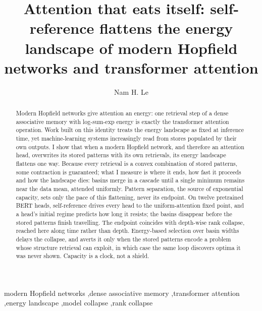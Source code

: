 \documentclass[preprint,12pt,authoryear]{elsarticle}
\begin{document}
\begin{frontmatter}

\title{Attention that eats itself: self-reference flattens the energy
landscape of modern Hopfield networks and transformer attention}

\author{Nam H. Le}

\begin{abstract}
Modern Hopfield networks give attention an energy: one retrieval step of a
dense associative memory with log-sum-exp energy is exactly the transformer
attention operation. Work built on this identity treats the energy landscape
as fixed at inference time, yet machine-learning systems increasingly read
from stores populated by their own outputs. I show that when a modern
Hopfield network, and therefore an attention head, overwrites its stored
patterns with its own retrievals, its energy landscape flattens one way.
Because every retrieval is a convex combination of stored patterns, some
contraction is guaranteed; what I measure is where it ends, how fast it
proceeds and how the landscape dies: basins merge in a cascade until a
single minimum remains near the data mean, attended uniformly. Pattern separation, the source of exponential capacity,
sets only the pace of this flattening, never its endpoint. On twelve
pretrained BERT heads, self-reference drives every head to the
uniform-attention fixed point, and a head's initial regime predicts how long
it resists; the basins disappear before the stored patterns finish
travelling. The endpoint coincides with depth-wise rank collapse, reached
here along time rather than depth. Energy-based selection over basin widths
delays the collapse, and averts it only when the stored patterns encode a
problem whose structure retrieval can exploit, in which case the same loop
discovers optima it was never shown. Capacity is a clock, not a shield.
\end{abstract}

\begin{keyword}
modern Hopfield networks \sep dense associative memory \sep transformer
attention \sep energy landscape \sep model collapse \sep rank collapse
\end{keyword}

\end{frontmatter}
\end{document}

